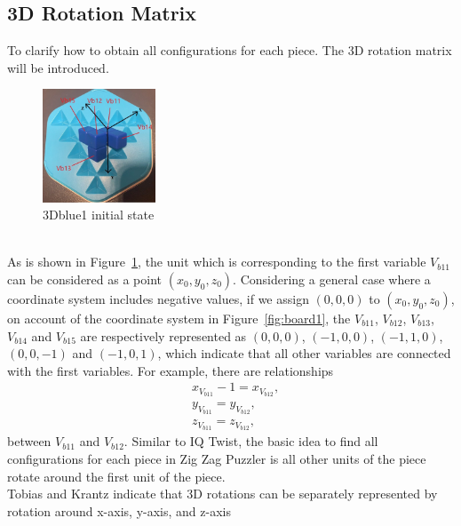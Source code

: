 \subsection{3D Rotation Matrix}
\label{section:3Drotationmatrix}
To clarify how to obtain all configurations for each piece. The 3D rotation matrix will be introduced.
\begin{figure}[htbp]
\label{figure:3Dblue1}
\centering
\includegraphics[width=0.3\textwidth]{figs/3Drotateexplain.jpg}
\caption{3Dblue1 initial state}
\label{fig:3Dblue1explanation}
\end{figure}
\\As is shown in Figure~\ref{fig:3Dblue1explanation}, the unit which is corresponding to the first variable $V_{b11}$ can be considered as a point $(x_{0},y_{0},z_{0})$. Considering a general case where a coordinate system includes negative values, if we assign $(0,0,0)$ to $(x_{0},y_{0},z_{0})$, on account of the coordinate system in Figure~\ref{fig:board1}, the $V_{b11}$, $V_{b12}$, $V_{b13}$, $V_{b14}$ and $V_{b15}$ are respectively represented as $(0,0,0)$, $(-1,0,0)$, $(-1,1,0)$, $(0,0,-1)$ and $(-1,0,1)$, which indicate that all other variables are connected with the first variables. For example, there are relationships
\begin{equation}
\begin{aligned}
&x_{V_{b11}}-1=x_{V_{b12}},\\
&y_{V_{b11}}=y_{V_{b12}},\\
&z_{V_{b11}}=z_{V_{b12}},
\end{aligned}
\end{equation}
between $V_{b11}$ and $V_{b12}$.
Similar to IQ Twist, the basic idea to find all configurations for each piece in Zig Zag Puzzler is all other units of the piece rotate around the first unit of the piece.
\\Tobias and Krantz \cite{r9} indicate that 3D rotations can be separately represented by rotation around x-axis, y-axis, and z-axis 
